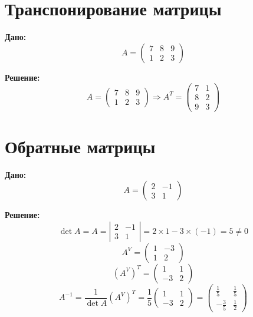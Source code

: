\documentclass[a4paper,12pt]{article} %
\begin{document}
\section{Транспонирование матрицы}

\textbf{Дано:}
\begin{equation*}
A = \left(
\begin{array}{ccc}
7 & 8 & 9\\
1 & 2 & 3 
\end{array}
\right)
\end{equation*}

\textbf{Решение:}
\begin{equation*}
A = \left(
\begin{array}{ccc}
7 & 8 & 9\\
1 & 2 & 3 
\end{array}
\right) \Rightarrow A^T = \left(
\begin{array}{cc}
7 & 1\\
8 & 2\\
9 & 3
\end{array}
\right)
\end{equation*}

\section{Обратные матрицы}

\textbf{Дано:}
\begin{equation*}
A = \left(
\begin{array}{cc}
2 & -1\\
3 & 1 
\end{array}
\right)
\end{equation*}

\textbf{Решение:}
\begin{equation*}
\det A = A = \left|
\begin{array}{cc}
2 & -1\\
3 & 1 
\end{array}
\right| = 2 \times 1 - 3 \times (-1) = 5 \neq 0
\end{equation*}
\begin{equation*}
A^V = \left(
\begin{array}{cc}
1 & -3\\
1 & 2 
\end{array}
\right)
\end{equation*}
\begin{equation*}
    (A^V)^T = \left(
\begin{array}{cc}
1 & 1\\
-3 & 2 
\end{array}
\right)
\end{equation*}
\begin{equation*}
A^{-1} = \frac{1}{\det A}(A^V)^T=\frac{1}{5} \left(
\begin{array}{cc}
1 & 1\\
-3 & 2 
\end{array}
\right) = \left(
\begin{array}{cc}
\frac{1}{5} & \frac{1}{5}\\
- \frac{3}{5} & \frac{1}{2}
\end{array}
\right)
\end{equation*}
\end{document}
